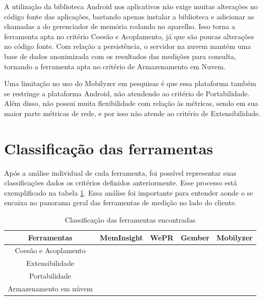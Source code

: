\documentclass[12pt]{tcc}
\newcommand{\cmark}{\ding{51}}
\newcommand{\xmark}{\ding{55}}
\begin{document}
	A utilização da biblioteca Android nos aplicativos não exige muitas alterações no código fonte das aplicações, bastando apenas instalar a biblioteca e adicionar as chamadas a  do gerenciador de memória rodando no aparelho. Isso torna a ferramenta apta no critério Coesão e Acoplamento, já que são poucas alterações no código fonte. Com relação a persistência, o servidor na nuvem mantém uma base de dados anonimizada com os resultados das medições para consulta, tornando a ferramenta apta no critério de Armazenamento em Nuvem.

	Uma limitação no uso do Mobilyzer em pesquisas é que essa plataforma também se restringe a plataforma Android, não atendendo ao critério de Portabilidade. Além disso, não possui muita flexibilidade com relação às métricas, sendo em sua maior parte métricas de rede, e por isso não atende ao critério de Extensibilidade.
		
	\section{Classificação das ferramentas}
	\label{section:analise-ferramentas}
	Após a análise individual de cada ferramenta, foi possível representar suas classificações dados os critérios definidos anteriormente. Esse processo está exemplificado na tabela \ref{table:classificacao-sem-elc}. Essa análise foi importante para entender aonde o  se encaixa no panorama geral das ferramentas de medição no lado do cliente.

	\begin{table}[ht]
	\caption{Classificação das ferramentas encontradas} %
	\centering %
	\begin{tabular}{c c c c c } %
	\toprule %

	\textbf{Ferramentas} &\textbf{MemInsight} & \textbf{WePR} & \textbf{Gember} & \textbf{Mobilyzer}  \\ [0.4ex]

	\midrule %
	Coesão e Acoplamento & \cmark & \cmark & \cmark & \cmark   \\
	Extensibilidade & \xmark & \xmark & \xmark & \xmark  \\
	Portabilidade & \cmark & \xmark & \xmark & \xmark  \\
	Armazenamento em núvem & \xmark & \cmark & \cmark & \cmark  \\
	\bottomrule %
	\end{tabular}
	\label{table:classificacao-sem-elc} %
	\end{table}
\end{document}
